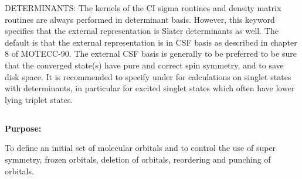 DETERMINANTS: The kernels of the CI sigma routines and density matrix
routines are always performed in determinant
basis.  However, this
keyword specifies that the external representation is Slater
determinants as well.  The default is that the external representation
is in CSF basis as
described in chapter 8 of MOTECC-90.  The external
CSF basis is
generally to be preferred to be sure that the converged
state(s) have pure and correct spin symmetry, and
to save disk space.
It is recommended to specify  under
 for
calculations on singlet states with
determinants,
in particular for
excited singlet states which often have lower lying triplet states.


\pagebreak[3]
\subsection{\label{ref-orbinp}}

{\bf Purpose:}

To define an initial set of molecular orbitals
and to control the use of super symmetry, frozen
orbitals, deletion of orbitals,
reordering and punching of orbitals.

